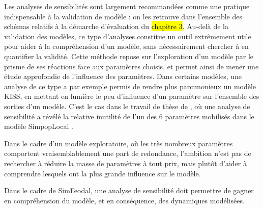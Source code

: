 Les analyses de sensibilités sont largement recommandées comme une pratique indispensable à la validation de modèle : on les retrouve dans l'ensemble des schémas relatifs à la démarche d'évaluation du \hl{chapitre 3}.
Au-delà de la validation des modèles, ce type d'analyses constitue un outil extrêmement utile pour aider à la compréhension d'un modèle, sans nécessairement chercher à en quantifier la validité.
Cette méthode repose sur l'exploration d'un modèle par le prisme de ses réactions face aux paramètres choisis, et permet ainsi de mener une étude approfondie de l'influence des paramètres.
Dans certains modèles, une analyse de ce type a par exemple permis de rendre plus parcimonieux un modèle KISS, en mettant en lumière le peu d'influence d'un paramètre sur l'ensemble des sorties d'un modèle.
C'est le cas dans le travail de thèse de , où une analyse de sensibilité a révélé la relative inutilité de l'un des 6 paramètres mobilisés dans le modèle SimpopLocal \autocite[224-225]{schmitt_modelisation_2014}.

Dans le cadre d'un modèle exploratoire, où les très nombreux paramètres comportent vraisemblablement une part de redondance, l'ambition n'est pas de rechercher à réduire la masse de paramètres à tout prix, mais plutôt d'aider à comprendre lesquels ont la plus grande influence sur le modèle.

Dans le cadre de SimFeodal, une analyse de sensibilité doit permettre de gagner en compréhension du modèle, et en conséquence, des dynamiques modélisées.



